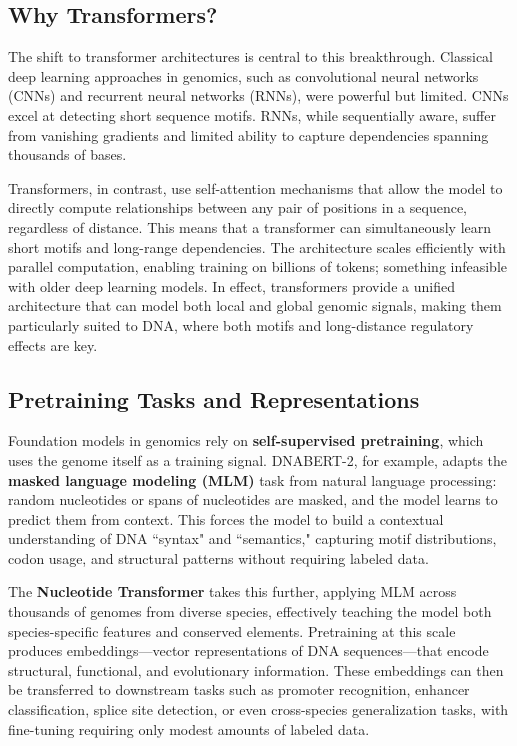\subsection{Why Transformers?}

The shift to transformer architectures is central to this breakthrough. Classical deep learning approaches in genomics, such as convolutional neural networks (CNNs) and recurrent neural networks (RNNs), were powerful but limited. CNNs excel at detecting short sequence motifs. RNNs, while sequentially aware, suffer from vanishing gradients and limited ability to capture dependencies spanning thousands of bases.

Transformers, in contrast, use self-attention mechanisms \cite{vaswani2017attention} that allow the model to directly compute relationships between any pair of positions in a sequence, regardless of distance. This means that a transformer can simultaneously learn short motifs and long-range dependencies. The architecture scales efficiently with parallel computation, enabling training on billions of tokens; something infeasible with older deep learning models. In effect, transformers provide a unified architecture that can model both local and global genomic signals, making them particularly suited to DNA, where both motifs and long-distance regulatory effects are key.

\subsection{Pretraining Tasks and Representations}

Foundation models in genomics rely on \textbf{self-supervised pretraining}, which uses the genome itself as a training signal. DNABERT-2, for example, adapts the \textbf{masked language modeling (MLM)} task from natural language processing: random nucleotides or spans of nucleotides are masked, and the model learns to predict them from context. This forces the model to build a contextual understanding of DNA ``syntax" and ``semantics," capturing motif distributions, codon usage, and structural patterns without requiring labeled data.

The \textbf{Nucleotide Transformer} takes this further, applying MLM across thousands of genomes from diverse species, effectively teaching the model both species-specific features and conserved elements. Pretraining at this scale produces embeddings—vector representations of DNA sequences—that encode structural, functional, and evolutionary information. These embeddings can then be transferred to downstream tasks such as promoter recognition, enhancer classification, splice site detection, or even cross-species generalization tasks, with fine-tuning requiring only modest amounts of labeled data.

